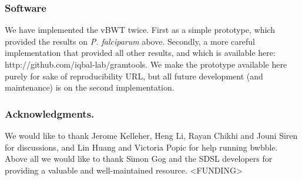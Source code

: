 \documentclass[runningheads,a4paper]{llncs}
\begin{document}
\subsubsection{Software}
We have implemented the vBWT twice. First as a simple prototype, which provided the results on \textit{P. falciparum} above. Secondly,  a more careful implementation that provided all other results, and which is available here: http://github.com/iqbal-lab/gramtools. We make the prototype available here purely for sake of reproducibility URL, but all future development (and maintenance) is on the second implementation.



\subsubsection*{Acknowledgments.} We would like to thank Jerome Kelleher, Heng Li, Rayan Chikhi and Jouni Siren for discussions, and Lin Huang and Victoria Popic for help running bwbble. Above all we would like to thank Simon Gog and the SDSL developers for providing a valuable and well-maintained resource. <FUNDING>
\end{document}
